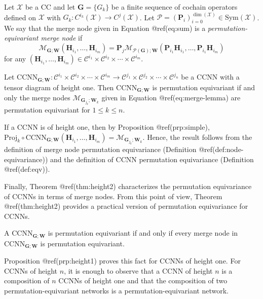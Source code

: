 \documentclass[
  12pt,
]{krantz}
\begin{document}
\label{node-equivariance}
Let \(\mathcal{X}\) be a CC and let \(\mathbf{G}= \{G_k\}\) be a finite
sequence of cochain operators defined on \(\mathcal{X}\) with
\(G_k\colon C^{i_k}(\mathcal{X})\to C^{j}(\mathcal{X})\). Let
\(\mathcal{P}=(\mathbf{P}_i)_{i=0}^{\dim(\mathcal{X})} \in \mbox{Sym}(\mathcal{X})\).
We say that the merge node given in Equation @ref(eq:sum) is a
\emph{permutation-equivariant merge node} if \begin{equation}
\mathcal{M}_{\mathbf{G};\mathbf{W}}(\mathbf{H}_{i_1},\ldots ,\mathbf{H}_{i_m})= \mathbf{P}_{j}  \mathcal{M}_{\mathcal{P}(\mathbf{G});\mathbf{W}}(\mathbf{P}_{i_1} \mathbf{H}_{i_1}, \ldots ,\mathbf{P}_{i_1} \mathbf{H}_{i_m})
\end{equation} for any
\((\mathbf{H}_{i_1},\ldots ,\mathbf{H}_{i_m}) \in \mathcal{C}^{i_1}\times\mathcal{C}^{i_2}\times \cdots \times  \mathcal{C}^{i_m}\).

\label{height1}
Let
\(\mbox{CCNN}_{\mathbf{G};\mathbf{W}}\colon \mathcal{C}^{i_1}\times\mathcal{C}^{i_2}\times \cdots \times  \mathcal{C}^{i_m} \to \mathcal{C}^{j_1}\times\mathcal{C}^{j_2}\times \cdots \times \mathcal{C}^{j_n}\)
be a CCNN with a tensor diagram of height one. Then
\(\mbox{CCNN}_{\mathbf{G};\mathbf{W}}\) is permutation equivariant if
and only the merge nodes \(\mathcal{M}_{\mathbf{G}_{j_k};\mathbf{W}_k}\)
given in Equation @ref(eq:merge-lemma) are permutation equivariant for
\(1 \leq k \leq n\).

If a CCNN is of height one, then by Proposition @ref(prp:simple),
\(\mbox{Proj}_k \circ \mbox{CCNN}_{\mathbf{G};\mathbf{W}}(\mathbf{H}_{i_1},\ldots ,\mathbf{H}_{i_m})= \mathcal{M}_{\mathbf{G}_{j_k};\mathbf{W}_k}\).
Hence, the result follows from the definition of merge node permutation
equivariance (Definition @ref(def:node-equivariance)) and the definition
of CCNN permutation equivariance (Definition @ref(def:eqv)).

Finally, Theorem @ref(thm:height2) characterizes the permutation
equivariance of CCNNs in terms of merge nodes. From this point of view,
Theorem @ref(thm:height2) provides a practical version of permutation
equivariance for CCNNs.

\label{height2}
A \(\mbox{CCNN}_{\mathbf{G};\mathbf{W}}\) is permutation equivariant if
and only if every merge node in \(\mbox{CCNN}_{\mathbf{G};\mathbf{W}}\)
is permutation equivariant.

Proposition @ref(prp:height1) proves this fact for CCNNs of height one.
For CCNNs of height \(n\), it is enough to observe that a CCNN of height
\(n\) is a composition of \(n\) CCNNs of height one and that the
composition of two permutation-equivariant networks is a
permutation-equivariant network.
\end{document}
